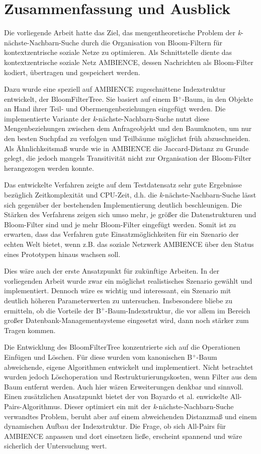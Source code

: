 \chapter{Zusammenfassung und Ausblick}\label{ch:zusammenfassung}
Die vorliegende Arbeit hatte das Ziel, das mengentheoretische Problem der \textit{k}-nächste-Nachbarn-Suche durch die Organisation von Bloom-Filtern für kontextzentrische soziale Netze zu optimieren. Als Schnittstelle diente das kontextzentrische soziale Netz AMBIENCE, dessen Nachrichten als Bloom-Filter kodiert, übertragen und gespeichert werden. 

Dazu wurde eine speziell auf AMBIENCE zugeschnittene Indexstruktur entwickelt, der BloomFilterTree. Sie basiert auf einem B$^+$-Baum, in den Objekte an Hand ihrer Teil- und Obermengenbeziehungen eingefügt werden. Die implementierte Variante der \textit{k}-nächste-Nachbarn-Suche nutzt diese Mengenbeziehungen zwischen dem Anfrageobjekt und den Baumknoten, um nur den besten Suchpfad zu verfolgen und Teilbäume möglichst früh abzuschneiden. Als Ähnlichkeitsmaß wurde wie in AMBIENCE die Jaccard-Distanz zu Grunde gelegt, die jedoch mangels Transitivität nicht zur Organisation der Bloom-Filter herangezogen werden konnte. 

Das entwickelte Verfahren zeigte auf dem Testdatensatz sehr gute Ergebnisse bezüglich Zeitkomplexität und CPU-Zeit, d.h. die \textit{k}-nächste-Nachbarn-Suche lässt sich gegenüber der bestehenden Implementierung deutlich beschleunigen. Die Stärken des Verfahrens zeigen sich umso mehr, je größer die Datenstrukturen und Bloom-Filter sind und je mehr Bloom-Filter eingefügt werden. Somit ist zu erwarten, dass das Verfahren gute Einsatzmöglichkeiten für ein Szenario der echten Welt bietet, wenn z.B. das soziale Netzwerk AMBIENCE über den Status eines Prototypen hinaus wachsen soll. 

Dies wäre auch der erste Ansatzpunkt für zukünftige Arbeiten. In der vorliegenden Arbeit wurde zwar ein möglichst realistisches Szenario gewählt und implementiert. Dennoch wäre es wichtig und interessant, ein Szenario mit deutlich höheren Parameterwerten zu untersuchen. Insbesondere bliebe zu ermitteln, ob die Vorteile der B$^+$-Baum-Indexstruktur, die vor allem im Bereich großer Datenbank-Managementsysteme eingesetzt wird, dann noch stärker zum Tragen kommen. 

Die Entwicklung des BloomFilterTree konzentrierte sich auf die Operationen Einfügen und Löschen. Für diese wurden vom kanonischen B$^+$-Baum abweichende, eigene Algorithmen entwickelt und implementiert. Nicht betrachtet wurden jedoch Löschoperation und Restrukturierungskosten, wenn Filter aus dem Baum entfernt werden. Auch hier wären Erweiterungen denkbar und sinnvoll. Einen zusätzlichen Ansatzpunkt bietet der von Bayardo et al. enwickelte All-Pairs-Algorithmus. Dieser optimiert ein mit der \textit{k}-nächste-Nachbarn-Suche verwandtes Problem, beruht aber auf einem abweichenden Distanzmaß und einem dynamischen Aufbau der Indexstruktur. Die Frage, ob sich All-Pairs für AMBIENCE anpassen und dort einsetzen ließe, erscheint spannend und wäre sicherlich der Untersuchung wert. 